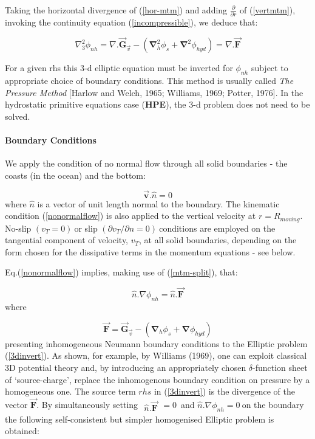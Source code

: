 Taking the horizontal divergence of (\ref{hor-mtm}) and adding $\frac{
\partial }{\partial r}$ of (\ref{vertmtm}), invoking the continuity equation
(\ref{incompressible}), we deduce that:

\begin{equation}
\nabla _{3}^{2}\phi _{nh}=\nabla .\vec{\mathbf{G}}_{\vec{v}}-\left( \mathbf{
\nabla }_{h}^{2}\phi _{s}+\mathbf{\nabla }^{2}\phi _{hyd}\right) =\nabla .
\vec{\mathbf{F}}  \label{eq:3d-invert}
\end{equation}

For a given rhs this 3-d elliptic equation must be inverted for $\phi _{nh}$
subject to appropriate choice of boundary conditions. This method is usually
called \textit{The Pressure Method} [Harlow and Welch, 1965; Williams, 1969;
Potter, 1976]. In the hydrostatic primitive equations case (\textbf{HPE}),
the 3-d problem does not need to be solved.

\paragraph{Boundary Conditions}

We apply the condition of no normal flow through all solid boundaries - the
coasts (in the ocean) and the bottom:

\begin{equation}
\vec{\mathbf{v}}.\widehat{n}=0  \label{nonormalflow}
\end{equation}
where $\widehat{n}$ is a vector of unit length normal to the boundary. The
kinematic condition (\ref{nonormalflow}) is also applied to the vertical
velocity at $r=R_{moving}$. No-slip $\left( v_{T}=0\right) \ $or slip $
\left( \partial v_{T}/\partial n=0\right) \ $conditions are employed on the
tangential component of velocity, $v_{T}$, at all solid boundaries,
depending on the form chosen for the dissipative terms in the momentum
equations - see below.

Eq.(\ref{nonormalflow}) implies, making use of (\ref{mtm-split}), that:

\begin{equation}
\widehat{n}.\nabla \phi _{nh}=\widehat{n}.\vec{\mathbf{F}}
\label{eq:inhom-neumann-nh}
\end{equation}
where

\[
\vec{\mathbf{F}}=\vec{\mathbf{G}}_{\vec{v}}-\left( \mathbf{\nabla }_{h}\phi
_{s}+\mathbf{\nabla }\phi _{hyd}\right) 
\]
presenting inhomogeneous Neumann boundary conditions to the Elliptic problem
(\ref{3dinvert}). As shown, for example, by Williams (1969), one can exploit
classical 3D potential theory and, by introducing an appropriately chosen $
\delta $-function sheet of `source-charge', replace the inhomogenous
boundary condition on pressure by a homogeneous one. The source term $rhs$
in (\ref{3dinvert}) is the divergence of the vector $\vec{\mathbf{F}}.$ By
simultaneously setting $
\begin{array}{l}
\widehat{n}.\vec{\mathbf{F}}
\end{array}
=0$\ and $\widehat{n}.\nabla \phi _{nh}=0\ $on the boundary the following
self-consistent but simpler homogenised Elliptic problem is obtained:

